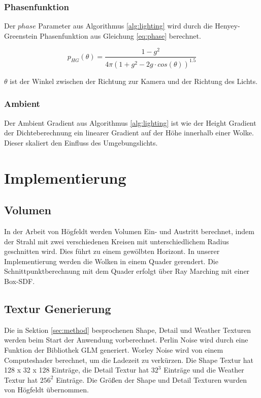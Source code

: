 \subsubsection{Phasenfunktion}
Der $ phase $ Parameter aus Algorithmus \ref{alg:lighting} wird durch die Henyey-Greenstein Phasenfunktion \cite{Henyey41} aus Gleichung \ref{eq:phase} berechnet.

\begin{equation}
\label{eq:phase}
    p_{HG}(\theta) = \frac{1 - g^2}{4\pi (1 + g^2 - 2g \cdot cos(\theta))^{1.5}}
\end{equation}

$ \theta $ ist der Winkel zwischen der Richtung zur Kamera und der Richtung des Lichts.

\subsubsection{Ambient}
Der Ambient Gradient aus Algorithmus \ref{alg:lighting} ist wie der Height Gradient der Dichteberechnung ein linearer Gradient auf der Höhe innerhalb einer Wolke. Dieser skaliert den Einfluss des Umgebungslichts.

\section{Implementierung}
\label{sec:implement}

\subsection{Volumen}
In der Arbeit von Högfeldt \cite{Högfeldt16} werden Volumen Ein- und Austritt berechnet, indem der Strahl mit zwei verschiedenen Kreisen mit unterschiedlichem Radius geschnitten wird. Dies führt zu einem gewölbten Horizont. In unserer Implementierung werden die Wolken in einem Quader gerendert. Die Schnittpunktberechnung mit dem Quader erfolgt über Ray Marching mit einer Box-SDF.

\subsection{Textur Generierung}
Die in Sektion \ref{sec:method} besprochenen Shape, Detail und Weather Texturen werden beim Start der Anwendung vorberechnet. Perlin Noise wird durch eine Funktion der Bibliothek GLM generiert. Worley Noise wird von einem Computeshader berechnet, um die Ladezeit zu verkürzen. Die Shape Textur hat 128 x 32 x 128 Einträge, die Detail Textur hat $ 32^3 $ Einträge und die Weather Textur hat $ 256^2 $ Einträge. Die Größen der Shape und Detail Texturen wurden von Högfeldt \cite{Högfeldt16} übernommen.

